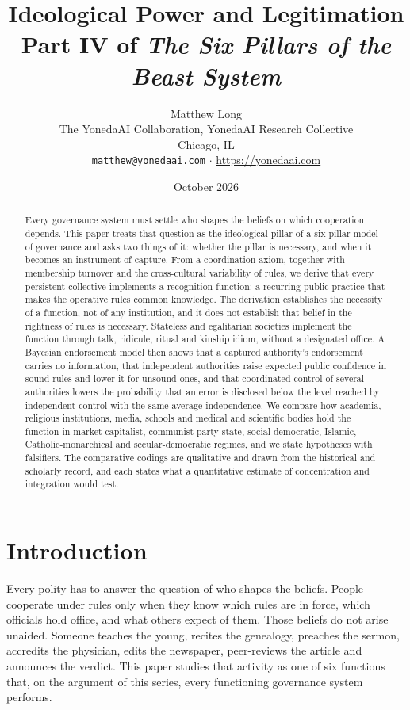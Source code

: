 \documentclass[11pt,letterpaper]{article}
\title{Ideological Power and Legitimation\\[4pt]
  {\normalsize Part IV of \emph{The Six Pillars of the Beast System}}}
\author{Matthew Long\\
  \small The YonedaAI Collaboration, YonedaAI Research Collective\\
  \small Chicago, IL\\
  \small \texttt{matthew@yonedaai.com} $\cdot$ \url{https://yonedaai.com}}
\date{October 2026}
\theoremstyle{definition}
\theoremstyle{remark}
\begin{document}
\maketitle

\begin{abstract}
Every governance system must settle who shapes the beliefs on which cooperation depends. This paper treats that question as the ideological pillar of a six-pillar model of governance and asks two things of it: whether the pillar is necessary, and when it becomes an instrument of capture. From a coordination axiom, together with membership turnover and the cross-cultural variability of rules, we derive that every persistent collective implements a recognition function: a recurring public practice that makes the operative rules common knowledge. The derivation establishes the necessity of a function, not of any institution, and it does not establish that belief in the rightness of rules is necessary. Stateless and egalitarian societies implement the function through talk, ridicule, ritual and kinship idiom, without a designated office. A Bayesian endorsement model then shows that a captured authority's endorsement carries no information, that independent authorities raise expected public confidence in sound rules and lower it for unsound ones, and that coordinated control of several authorities lowers the probability that an error is disclosed below the level reached by independent control with the same average independence. We compare how academia, religious institutions, media, schools and medical and scientific bodies hold the function in market-capitalist, communist party-state, social-democratic, Islamic, Catholic-monarchical and secular-democratic regimes, and we state hypotheses with falsifiers. The comparative codings are qualitative and drawn from the historical and scholarly record, and each states what a quantitative estimate of concentration and integration would test.
\end{abstract}

\section{Introduction}
\label{sec:intro}

Every polity has to answer the question of who shapes the beliefs. People cooperate under rules only when they know which rules are in force, which officials hold office, and what others expect of them. Those beliefs do not arise unaided. Someone teaches the young, recites the genealogy, preaches the sermon, accredits the physician, edits the newspaper, peer-reviews the article and announces the verdict. This paper studies that activity as one of six functions that, on the argument of this series, every functioning governance system performs.
\end{document}
